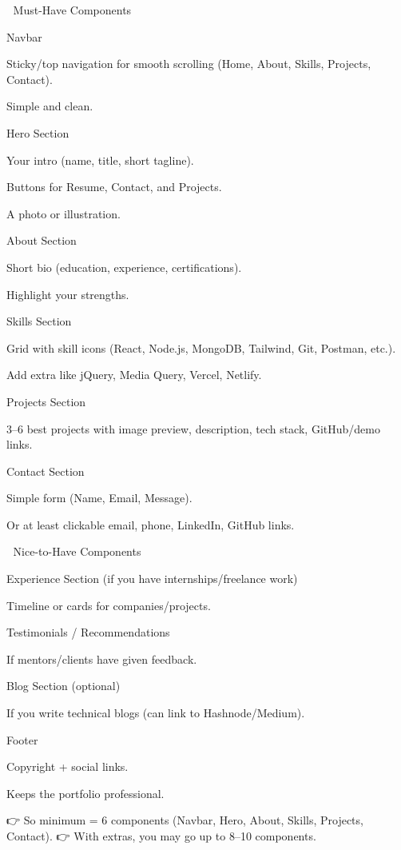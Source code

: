 🔹 Must-Have Components

Navbar

Sticky/top navigation for smooth scrolling (Home, About, Skills, Projects, Contact).

Simple and clean.

Hero Section

Your intro (name, title, short tagline).

Buttons for Resume, Contact, and Projects.

A photo or illustration.

About Section

Short bio (education, experience, certifications).

Highlight your strengths.

Skills Section

Grid with skill icons (React, Node.js, MongoDB, Tailwind, Git, Postman, etc.).

Add extra like jQuery, Media Query, Vercel, Netlify.

Projects Section

3–6 best projects with image preview, description, tech stack, GitHub/demo links.

Contact Section

Simple form (Name, Email, Message).

Or at least clickable email, phone, LinkedIn, GitHub links.

🔹 Nice-to-Have Components

Experience Section (if you have internships/freelance work)

Timeline or cards for companies/projects.

Testimonials / Recommendations

If mentors/clients have given feedback.

Blog Section (optional)

If you write technical blogs (can link to Hashnode/Medium).

Footer

Copyright + social links.

Keeps the portfolio professional.

👉 So minimum = 6 components (Navbar, Hero, About, Skills, Projects, Contact).
👉 With extras, you may go up to 8–10 components.